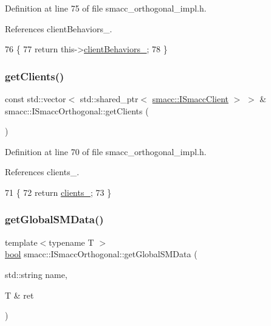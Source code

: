 Definition at line 75 of file smacc\+\_\+orthogonal\+\_\+impl.\+h.



References client\+Behaviors\+\_\+.


\begin{DoxyCode}
76 \{
77     \textcolor{keywordflow}{return} this->\hyperlink{classsmacc_1_1ISmaccOrthogonal_ad9e6c0f9055e51a61c9728ac7117dae2}{clientBehaviors\_};
78 \}
\end{DoxyCode}
\mbox{\label{classsmacc_1_1ISmaccOrthogonal_a83f1d5390ec41d91566e6f034b25b7d9}} 
\subsubsection{\texorpdfstring{get\+Clients()}{getClients()}}
{\footnotesize\ttfamily const std\+::vector$<$ std\+::shared\+\_\+ptr$<$ \hyperlink{classsmacc_1_1ISmaccClient}{smacc\+::\+I\+Smacc\+Client} $>$ $>$ \& smacc\+::\+I\+Smacc\+Orthogonal\+::get\+Clients (\begin{DoxyParamCaption}{ }\end{DoxyParamCaption})\hspace{0.3cm}{\ttfamily [inline]}}



Definition at line 70 of file smacc\+\_\+orthogonal\+\_\+impl.\+h.



References clients\+\_\+.


\begin{DoxyCode}
71 \{
72     \textcolor{keywordflow}{return} \hyperlink{classsmacc_1_1ISmaccOrthogonal_a0f270e9c8c126198f6bce542ab4e04ba}{clients\_};
73 \}
\end{DoxyCode}
\mbox{\label{classsmacc_1_1ISmaccOrthogonal_aa763280bc6980811744c8e8f11b2dcd0}} 
\subsubsection{\texorpdfstring{get\+Global\+S\+M\+Data()}{getGlobalSMData()}}
{\footnotesize\ttfamily template$<$typename T $>$ \\
\hyperlink{classbool}{bool} smacc\+::\+I\+Smacc\+Orthogonal\+::get\+Global\+S\+M\+Data (\begin{DoxyParamCaption}\item[{std\+::string}]{name,  }\item[{T \&}]{ret }\end{DoxyParamCaption})}



